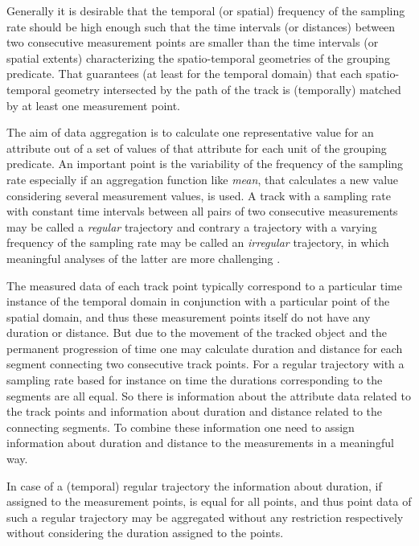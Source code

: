 \documentclass[12pt, oneside, a4paper]{scrbook}
\begin{document}
Generally it is desirable that the temporal (or spatial) frequency of the sampling rate should be high enough such that the time intervals (or distances) between two consecutive measurement points are smaller than the time intervals (or spatial extents) characterizing the spatio-temporal geometries of the grouping predicate.
That guarantees (at least for the temporal domain) that each spatio-temporal geometry intersected by the path of the track is (temporally) matched by at least one measurement point.
\par\medskip
The aim of data aggregation is to calculate one representative value for an attribute out of a set of values of that attribute for each unit of the grouping predicate.
An important point is the variability of the frequency of the sampling rate especially if an aggregation function like \textit{mean}, that calculates a new value considering several measurement values, is used. 
A track with a sampling rate with constant time intervals between all pairs of two consecutive measurements may be called a \textit{regular} trajectory and contrary a trajectory with a varying frequency of the sampling rate may be called an \textit{irregular} trajectory, in which meaningful analyses of the latter are more challenging \citep{calenge_concept_2009}.
\par\medskip
The measured data of each track point typically correspond to a particular time instance of the temporal domain in conjunction with a particular point of the spatial domain, and thus these measurement points itself do not have any duration or distance. 
But due to the movement of the tracked object and the permanent progression of time one may calculate duration and distance for each segment connecting two consecutive track points. 
For a regular trajectory with a sampling rate based for instance on time the durations corresponding to the segments are all equal.
So there is information about the attribute data related to the track points and information about duration and distance related to the connecting segments.
To combine these information one need to assign information about duration and distance to the measurements in a meaningful way.
\par\medskip
In case of a (temporal) regular trajectory the information about duration, if assigned to the measurement points, is equal for all points, and thus point data of such a regular trajectory may be aggregated without any restriction respectively without considering the duration assigned to the points.
\end{document}

